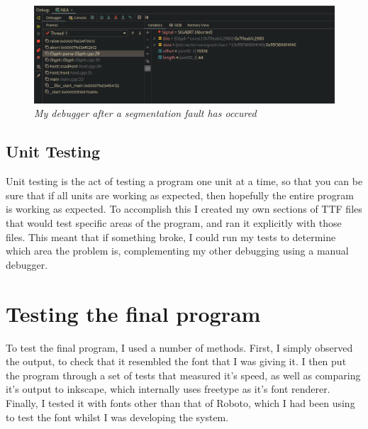 \documentclass{report}
\begin{document}
\begin{figure}[h]
  \centering
  \includegraphics[width=12cm]{debugging1}
  \caption{\textit{My debugger after a segmentation fault has occured}}
\end{figure}


\subsection{Unit Testing}

Unit testing is the act of testing a program one unit at a time, so that you can
be sure that if all units are working as expected, then hopefully the entire
program is working as expected. To accomplish this I created my own sections of
TTF files that would test specific areas of the program, and ran it explicitly
with those files. This meant that if something broke, I could run my tests to
determine which area the problem is, complementing my other debugging using a
manual debugger.

\section{Testing the final program}
To test the final program, I used a number of methods. First, I simply observed
the output, to check that it resembled the font that I was giving it. I then put
the program through a set of tests that measured it's speed, as well as
comparing it's output to inkscape, which internally uses freetype as it's font
renderer. Finally, I tested it with fonts other than that of Roboto, which I had
been using to test the font whilst I was developing the system.
\end{document}
